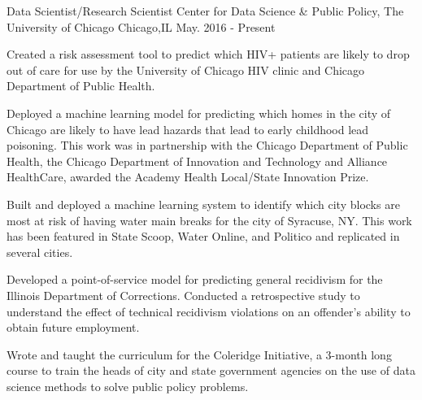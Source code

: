 

\begin{cventries}


  \cventry
    {Data Scientist/Research Scientist} %
    {Center for Data Science \& Public Policy, The University of Chicago} %
    {Chicago,IL} %
    {May. 2016 - Present} %
    {\begin{cvitems}
        \item {Created a risk assessment tool to predict which HIV+ patients are likely to drop out of care for use by the University of Chicago HIV clinic and Chicago Department of Public Health.}
        \item {Deployed a machine learning model for predicting which homes in the city of Chicago are likely to have lead hazards that lead to early childhood lead poisoning. This work was in  partnership with the Chicago Department of Public Health, the Chicago Department of Innovation and Technology and Alliance HealthCare, awarded the Academy Health Local/State Innovation Prize.}
         \item {Built and deployed a machine learning system to identify which city blocks are most at risk of having water main breaks for the city of Syracuse, NY. This work has been featured in State Scoop, Water Online, and Politico and replicated in several cities.}
         \item {Developed a point-of-service model for predicting general recidivism for the Illinois Department of Corrections. Conducted a retrospective study to understand the effect of technical recidivism violations on an offender's ability to obtain future employment.}
         \item{Wrote and taught the curriculum for the Coleridge Initiative, a 3-month long course to train the heads of city and state government agencies on the use of data science methods to solve public policy problems.}
     \end{cvitems}}



\end{cventries}
